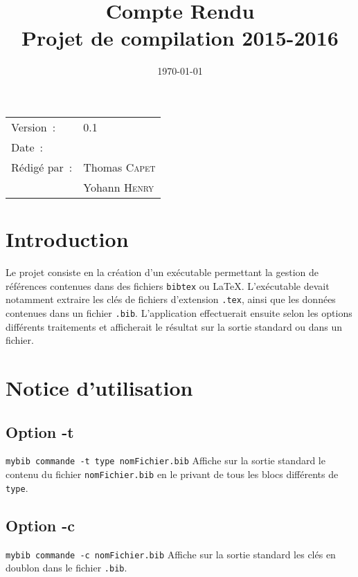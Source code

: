 \documentclass[hidelinks, a4paper,11pt,twoside,final]{article}
\title{\bfseries Compte Rendu \\ Projet de compilation 2015-2016}
\begin{document}
\maketitle
\begin{center}
\begin{tabular}{ll}
  Version~: & 0.1\\[.5em]
  Date~: & \date{\today}\\[.5em]
  Rédigé par~: & Thomas \textsc{Capet}\\
               & Yohann \textsc{Henry}\\
\end{tabular}
\end{center}

\newpage

\newpage
\tableofcontents

\newpage

\section{Introduction}
Le projet consiste en la création d'un exécutable permettant la gestion de références contenues dans des fichiers \texttt{bibtex} ou \LaTeX.
L'exécutable devait notamment extraire les clés de fichiers d'extension \texttt{.tex}, ainsi que les données contenues dans un fichier \texttt{.bib}.
L'application effectuerait ensuite selon les options différents traitements et afficherait le résultat sur la sortie standard ou dans un fichier.

\section{Notice d'utilisation}
\subsection{Option -t}
\texttt{mybib commande -t type nomFichier.bib}
\newline
Affiche sur la sortie standard le contenu du fichier \texttt{nomFichier.bib} 
en le privant de tous les blocs différents de \texttt{type}.

\subsection{Option -c}
\texttt{mybib commande -c nomFichier.bib}
\newline
Affiche sur la sortie standard les clés en doublon dans le fichier \texttt{.bib}.
\end{document}
